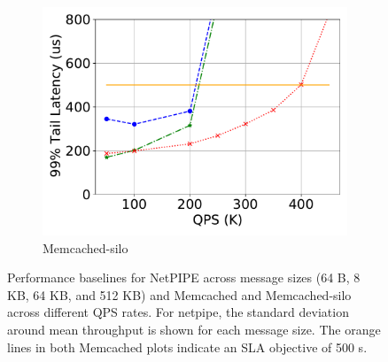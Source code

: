 \begin{figure}
\begin{subfigure}[b]{0.32\textwidth}
        \end{subfigure}
        \begin{subfigure}[b]{0.32\textwidth}   
            \centering 
            \caption[]%
            {{\small Memcached-silo}} 
             \vspace*{-0.3cm}     
            \label{fig:perf_mcdsilo}
            \includegraphics[width=1\textwidth]{osdi_figures/mcdsilo_sla.pdf}
        \end{subfigure}
        \caption[]
        {\small Performance baselines for NetPIPE across message sizes (64 B, 8 KB, 64 KB, and 512 KB) and  Memcached and Memcached-silo across different QPS rates.
For netpipe, the standard deviation around mean throughput is shown
for each message size.
The orange lines in both Memcached plots indicate an SLA objective of 500 {\micro}s.} 
        \label{fig:perf}
    \end{figure}
